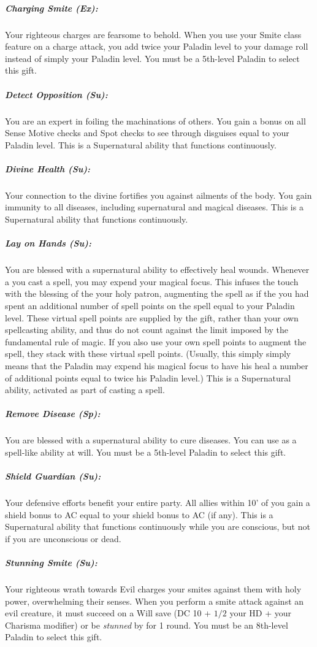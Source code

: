 \subparagraph{Charging Smite (Ex):}
Your righteous charges are fearsome to behold. When you use your Smite class feature on a charge attack, you add twice your Paladin level to your damage roll instead of simply your Paladin level. You must be a 5th-level Paladin to select this gift.

\subparagraph{Detect Opposition (Su):}
You are an expert in foiling the machinations of others. 
You gain a bonus on all Sense Motive checks and Spot checks to see through disguises equal to your Paladin level.
This is a Supernatural ability that functions continuously.

\subparagraph{Divine Health (Su):}
Your connection to the divine fortifies you against ailments of the body. You gain immunity to all diseases, including supernatural and magical diseases. This is a Supernatural ability that functions continuously.

\subparagraph{Lay on Hands (Su):}
You are blessed with a supernatural ability to effectively heal wounds. Whenever a you cast a  spell, you may expend your magical focus.
This infuses the touch with the blessing of the your holy patron, augmenting the spell as if the you had spent
an additional number of spell points on the spell equal to your Paladin level. 
These virtual spell points are supplied by the gift, rather than your own spellcasting ability, 
and thus do not count against the limit imposed by the fundamental rule of magic. 
If you also use your own spell points to augment the spell, they stack with these virtual spell points.
(Usually, this simply simply means that the Paladin may expend 
his magical focus to have his  heal a number of additional points equal to twice his Paladin level.)
This is a Supernatural ability, activated as part of casting a  spell.

\subparagraph{Remove Disease (Sp):}
You are blessed with a supernatural ability to cure diseases. You can use  as a spell-like ability at will.
You must be a 5th-level Paladin to select this gift.

\subparagraph{Shield Guardian (Su):}
Your defensive efforts benefit your entire party. All allies within 10' of you gain a shield bonus to AC equal to your shield bonus to AC (if any).
This is a Supernatural ability that functions continuously while you are conscious, but not if you are unconscious or dead.

\subparagraph{Stunning Smite (Su):}
Your righteous wrath towards Evil charges your smites against them with holy power, overwhelming their senses.
When you perform a smite attack against an evil creature, it must succeed on a Will save (DC 10 + $1/2$ your HD + your Charisma modifier) or be \emph{stunned} by for 1 round. You must be an 8th-level Paladin to select this gift.

